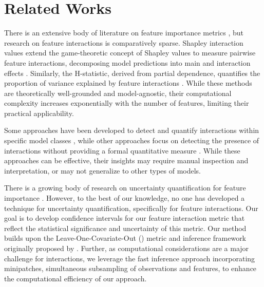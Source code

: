 \section{Related Works}
There is an extensive body of literature on feature importance metrics \citep{samek:2021, altmann:2010, lipovetsky:2001, murdoch:2019}, but research on feature interactions is comparatively sparse. Shapley interaction values extend the game-theoretic concept of Shapley values to measure pairwise feature interactions, decomposing model predictions into main and interaction effects \citep{Tsai:2023, Sundararajan:2020, Rabitti:2019}. Similarly, the H-statistic, derived from partial dependence, quantifies the proportion of variance explained by feature interactions \citep{Friedman:2008}. While these methods are theoretically well-grounded and model-agnostic, their computational complexity increases exponentially with the number of features, limiting their practical applicability.


Some approaches have been developed to detect and quantify interactions within specific model classes \citep{Basu:2018, Hornung:2022}, while other approaches focus on detecting the presence of interactions without providing a formal quantitative measure \citep{Inglis2022Visualizing}. While these approaches can be effective, their insights may require manual inspection and interpretation, or may not generalize to other types of models. 

There is a growing body of research on uncertainty quantification for feature importance \citep{lei:2014, lei:2018, williamson:2020, williamson:2023, napolitano:2023}. However, to the best of our knowledge, no one has developed a technique for uncertainty quantification, specifically for feature interactions. Our goal is to develop confidence intervals for our feature interaction metric that reflect the statistical significance and uncertainty of this metric. Our method builds upon the Leave-One-Covariate-Out (\loco) metric and inference framework originally proposed by \cite{lei:2014}. 
Further, as computational considerations are a major challenge for interactions, we leverage the fast inference approach incorporating minipatches, simultaneous subsampling of observations and features, to enhance the computational efficiency of our approach.